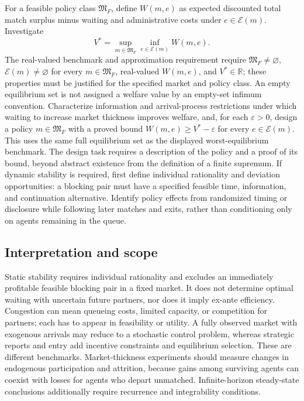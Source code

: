 \documentclass[11pt,a4paper]{article}
\newcommand{\R}{\mathbb R}
\begin{document}
For a feasible policy class $\mathfrak M_F$, define $W(m,e)$ as expected discounted total match surplus minus waiting and administrative costs under $e\in\mathcal E(m)$. Investigate
\[
V^*=\sup_{m\in\mathfrak M_F}\inf_{e\in\mathcal E(m)}W(m,e).
\]
The real-valued benchmark and approximation requirement require $\mathfrak M_F\ne\varnothing$, $\mathcal E(m)\ne\varnothing$ for every $m\in\mathfrak M_F$, real-valued $W(m,e)$, and $V^*\in\R$; these properties must be justified for the specified market and policy class. An empty equilibrium set is not assigned a welfare value by an empty-set infimum convention. Characterize information and arrival-process restrictions under which waiting to increase market thickness improves welfare, and, for each $\varepsilon>0$, design a policy $m\in\mathfrak M_F$ with a proved bound $W(m,e)\ge V^*-\varepsilon$ for every $e\in\mathcal E(m)$. This uses the same full equilibrium set as the displayed worst-equilibrium benchmark. The design task requires a description of the policy and a proof of its bound, beyond abstract existence from the definition of a finite supremum. If dynamic stability is required, first define individual rationality and deviation opportunities: a blocking pair must have a specified feasible time, information, and continuation alternative. Identify policy effects from randomized timing or disclosure while following later matches and exits, rather than conditioning only on agents remaining in the queue.

\subsection*{Interpretation and scope}

Static stability requires individual rationality and excludes an immediately profitable feasible blocking pair in a fixed market. It does not determine optimal waiting with uncertain future partners, nor does it imply ex-ante efficiency. Congestion can mean queueing costs, limited capacity, or competition for partners; each has to appear in feasibility or utility. A fully observed market with exogenous arrivals may reduce to a stochastic control problem, whereas strategic reports and entry add incentive constraints and equilibrium selection. These are different benchmarks. Market-thickness experiments should measure changes in endogenous participation and attrition, because gains among surviving agents can coexist with losses for agents who depart unmatched. Infinite-horizon steady-state conclusions additionally require recurrence and integrability conditions.
\end{document}
